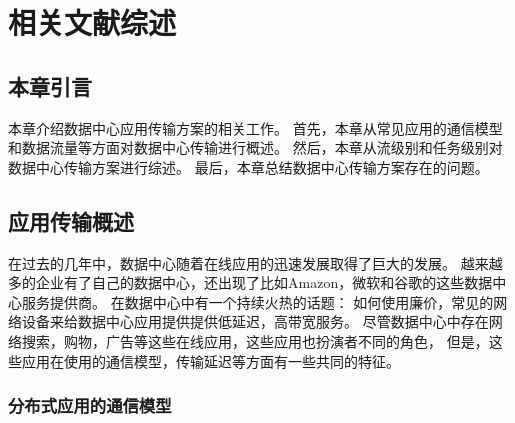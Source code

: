 \chapter{相关文献综述}
\label{chapter:background}

\section{本章引言}
本章介绍数据中心应用传输方案的相关工作。
首先，本章从常见应用的通信模型和数据流量等方面对数据中心传输进行概述。
然后，本章从流级别和任务级别对数据中心传输方案进行综述。
最后，本章总结数据中心传输方案存在的问题。


\section{应用传输概述}
在过去的几年中，数据中心随着在线应用的迅速发展取得了巨大的发展。
越来越多的企业有了自己的数据中心，还出现了比如Amazon，微软和谷歌的这些数据中心服务提供商。
在数据中心中有一个持续火热的话题：
如何使用廉价，常见的网络设备来给数据中心应用提供提供低延迟，高带宽服务。
尽管数据中心中存在网络搜索，购物，广告等这些在线应用，这些应用也扮演者不同的角色，
但是，这些应用在使用的通信模型，传输延迟等方面有一些共同的特征。

\subsection{分布式应用的通信模型}

